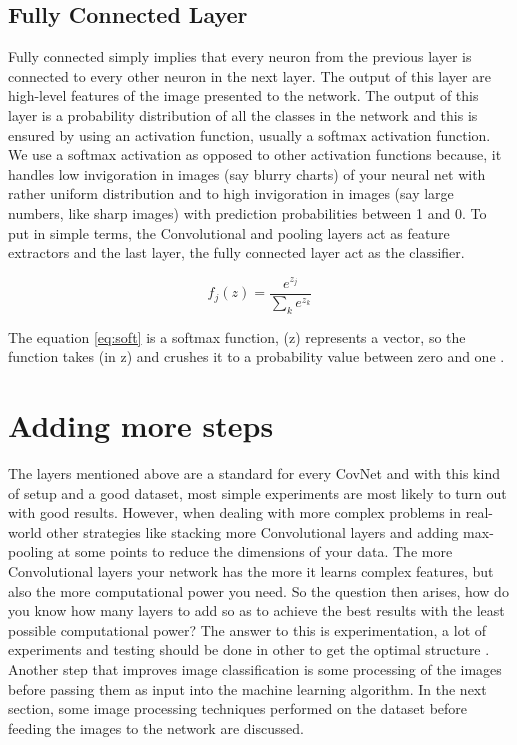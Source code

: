 \documentclass[12pt, a4paper,oneside]{report}
\begin{document}
\subsection{Fully Connected Layer}
Fully connected simply implies that every neuron from the previous layer is connected to every other neuron in the next layer. The output of this layer are high-level features of the image presented to the network. The output of this layer is a probability distribution of all the classes in the network and this is ensured by using an activation function, usually a softmax activation function. We use a softmax activation as opposed to other activation functions because, it handles low invigoration in images (say blurry charts) of your neural net with rather uniform distribution and to high invigoration in images (say large numbers, like sharp images) with prediction probabilities between 1 and 0. To put in simple terms, the Convolutional and pooling layers act as feature extractors and the last layer, the fully connected layer act as the classifier.

\begin{equation} \label{eq:soft}
f_j(z) = \frac{e^{z_j}}{\sum_k e^{z_k}}
\end{equation}

The equation \ref{eq:soft} is a softmax function, (z) represents a vector, so the function takes (in z) and crushes it to a probability value between zero and one \cite{softmax}.

\section{Adding more steps}
The layers mentioned above are a standard for every CovNet and with this kind of setup and a good dataset, most simple experiments are most likely to turn out with good results. However, when dealing with more complex problems in real-world other strategies like stacking more Convolutional layers and adding max-pooling at some points to reduce the dimensions of your data. The more Convolutional layers your network has the more it learns complex features, but also the more computational power you need. So the question then arises, how do you know how many layers to add so as to achieve the best results with the least possible computational power? The answer to this is experimentation, a lot of experiments and testing should be done in other to get the optimal structure \cite{layers}. Another step that improves image classification is some processing of the images before passing them as input into the machine learning algorithm. In the next section, some image processing techniques performed on the dataset before feeding the images to the network are discussed.
\end{document}

